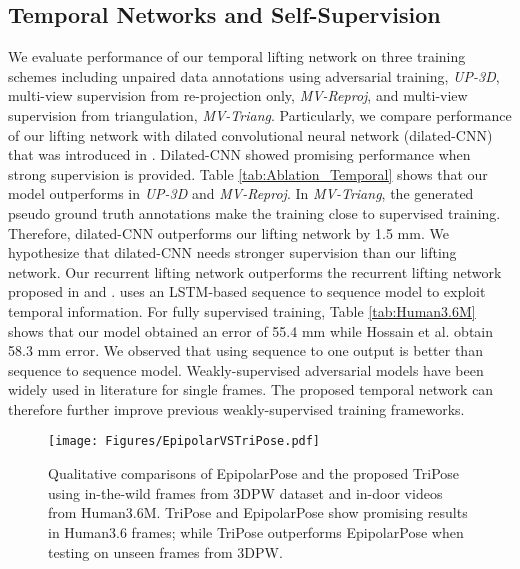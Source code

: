 \documentclass[10pt,twocolumn,letterpaper]{article}
\begin{document}
\subsection{Temporal Networks and Self-Supervision}
We evaluate performance of our temporal lifting network on three training schemes including unpaired data annotations using adversarial training, \textit{UP-3D}, multi-view supervision from re-projection only, \textit{MV-Reproj}, and multi-view supervision from triangulation, \textit{MV-Triang}. Particularly, we compare performance of our lifting network with dilated convolutional neural network (dilated-CNN) that was introduced in \cite{Pavllo_2019_CVPR}. Dilated-CNN showed promising performance when strong supervision is provided. Table \ref{tab:Ablation_Temporal} shows that our model outperforms in \textit{UP-3D} and \textit{MV-Reproj}. In \textit{MV-Triang}, the generated pseudo ground truth annotations make the training close to supervised training. Therefore, dilated-CNN outperforms our lifting network by 1.5 mm. We hypothesize that dilated-CNN needs stronger supervision than our lifting network. Our recurrent lifting network outperforms the recurrent lifting network proposed in \cite{Hossain_2018_ECCV} and \cite{Kocabas_2020_CVPR}. \cite{Hossain_2018_ECCV} uses an LSTM-based sequence to sequence model to exploit temporal information. For fully supervised training, Table \ref{tab:Human3.6M} shows that our model obtained an error of 55.4 mm while Hossain et al. \cite{Hossain_2018_ECCV} obtain 58.3 mm error. We observed that using sequence to one output is better than sequence to sequence model. Weakly-supervised adversarial models have been widely used in literature for single frames\cite{Wandt_2019_CVPR, Kanazawa_2018_CVPR}. The proposed temporal network can therefore further improve previous weakly-supervised training frameworks.  
\begin{figure}[t]
\begin{center}
\texttt{[image: Figures/EpipolarVSTriPose.pdf]}
\end{center}
  \caption{Qualitative comparisons of EpipolarPose \cite{Kocabas_2019_CVPR} and the proposed TriPose using in-the-wild frames from 3DPW dataset and in-door videos from Human3.6M. TriPose and EpipolarPose show promising results in Human3.6 frames; while TriPose outperforms EpipolarPose when testing on unseen frames from 3DPW. }
\label{fig:EpipolarvsTripose}
\end{figure}
\end{document}
